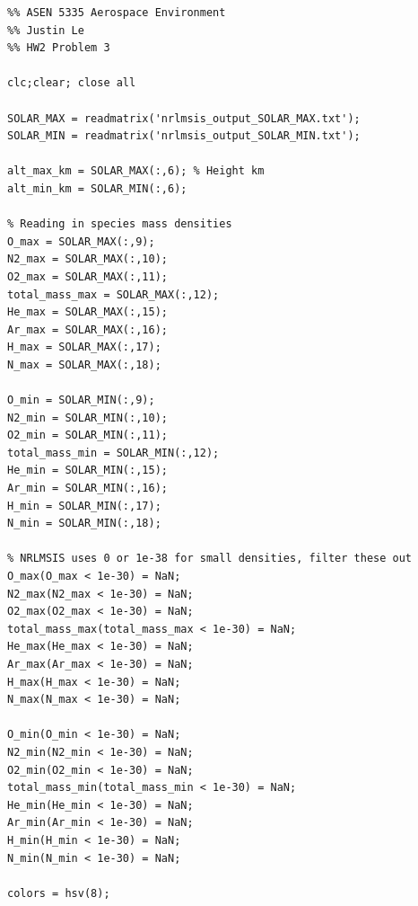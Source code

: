 \documentclass[11pt]{article}
\begin{document}
\begin{lstlisting}
%% ASEN 5335 Aerospace Environment
%% Justin Le
%% HW2 Problem 3

clc;clear; close all

SOLAR_MAX = readmatrix('nrlmsis_output_SOLAR_MAX.txt');
SOLAR_MIN = readmatrix('nrlmsis_output_SOLAR_MIN.txt');

alt_max_km = SOLAR_MAX(:,6); % Height km
alt_min_km = SOLAR_MIN(:,6);

% Reading in species mass densities
O_max = SOLAR_MAX(:,9);
N2_max = SOLAR_MAX(:,10);
O2_max = SOLAR_MAX(:,11);
total_mass_max = SOLAR_MAX(:,12);
He_max = SOLAR_MAX(:,15);
Ar_max = SOLAR_MAX(:,16);
H_max = SOLAR_MAX(:,17);
N_max = SOLAR_MAX(:,18);

O_min = SOLAR_MIN(:,9);
N2_min = SOLAR_MIN(:,10);
O2_min = SOLAR_MIN(:,11);
total_mass_min = SOLAR_MIN(:,12);
He_min = SOLAR_MIN(:,15);
Ar_min = SOLAR_MIN(:,16);
H_min = SOLAR_MIN(:,17);
N_min = SOLAR_MIN(:,18);

% NRLMSIS uses 0 or 1e-38 for small densities, filter these out
O_max(O_max < 1e-30) = NaN;
N2_max(N2_max < 1e-30) = NaN;
O2_max(O2_max < 1e-30) = NaN;
total_mass_max(total_mass_max < 1e-30) = NaN;
He_max(He_max < 1e-30) = NaN;
Ar_max(Ar_max < 1e-30) = NaN;
H_max(H_max < 1e-30) = NaN;
N_max(N_max < 1e-30) = NaN;

O_min(O_min < 1e-30) = NaN;
N2_min(N2_min < 1e-30) = NaN;
O2_min(O2_min < 1e-30) = NaN;
total_mass_min(total_mass_min < 1e-30) = NaN;
He_min(He_min < 1e-30) = NaN;
Ar_min(Ar_min < 1e-30) = NaN;
H_min(H_min < 1e-30) = NaN;
N_min(N_min < 1e-30) = NaN;

colors = hsv(8);


\end{lstlisting}
\end{document}
